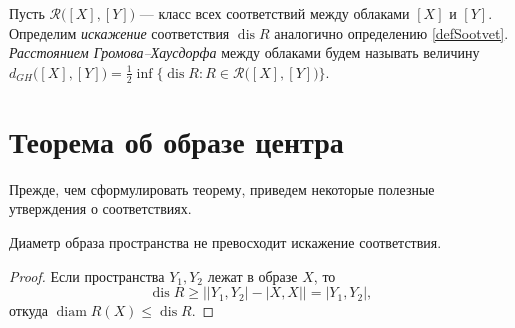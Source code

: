 \documentclass[11pt,twoside,draft
]{article}
\DeclareMathOperator{\dis}{dis}
\DeclareMathOperator{\diam}{diam}
\begin{document}
\begin{defin}
  Пусть $\mathcal{R}\big([X],[Y]\big)$ --- класс всех соответствий между
  облаками $[X]$ и $[Y]$. Определим \emph{искажение} соответствия $\dis R$
  аналогично определению \ref{defSootvet}. \emph{Расстоянием
  Громова--Хаусдорфа} между облаками
  будем называть величину
  $d_{GH}\big([X],[Y]\big) = \frac{1}{2}\inf\bigl\{\dis R : R\in
  \mathcal{R}\big([X],[Y]\big)\bigr\}$.
\end{defin}

\section{Теорема об образе центра}
Прежде, чем сформулировать теорему, приведем некоторые полезные
утверждения о соответствиях.
\begin{lemma}
  Диаметр образа пространства не превосходит
  искажение соответствия.
  \label{lemDiamImage}
\end{lemma}
\begin{proof}
  Если пространства $Y_{1}, Y_{2}$ лежат в образе $X$, то
  \[\dis R \ge \big|\left|Y_{1},Y_{2}\right| - \left|X,X\right|\big|
  = |Y_{1}, Y_{2}|,\]
  откуда $\diam R(X) \le \dis R$.
\end{proof}
\end{document}
